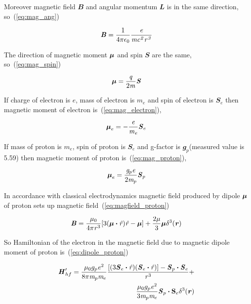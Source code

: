 \documentclass[fleqn,usenatbib]{mnras}
\begin{document}
Moreover magnetic field $\mathbfit{B}$ and angular momentum $\mathbfit{L}$ is in the same direction, so~(\ref{eq:mag_ang})

\begin{equation}
 \textbf{\textit{B}}=\frac{1}{4\pi\-\epsilon_{0}}\frac{\mathit{e}}{\mathit{mc^{2}r^{3}}}
 \label{eq:mag_ang}
\end{equation}

The direction of magnetic moment $\bmath{\mathit{\umu}}$ and spin $\mathbfit{S}$ are the same, so~(\ref{eq:mag_spin})

\begin{equation}
 \bmath{\mathit{\umu}}=\frac{\mathit{q}}{2\mathit{m}}\mathbfit{S}
 \label{eq:mag_spin}
\end{equation}

If charge of electron is $\mathit{e}$, mass of electron is $\mathit{m_{e}}$ and spin of electron is $\mathbfit{S}_{e}$ then magnetic moment of electron is~(\ref{eq:mag_electron}),

\begin{equation}
 \mathit{\bmath{\umu}}_{e}=-\frac{\mathit{e}}{\mathit{m_{e}}}\mathbfit{S}_{e}
 \label{eq:mag_electron}
\end{equation}

If mass of proton is $\mathit{m_{e}}$, spin of proton is ${\mathbfit{S}}_{e}$ and g-factor is $\mathbfit{g}_{p}$(measured value is 5.59) then magnetic moment of proton is~(\ref{eq:mag_proton}),

\begin{equation}
 \mathit{\bmath{\umu}}_{e}=\frac{\mathit{g}_{p}\mathit{e}}{2\mathit{m}_{p}}\mathbfit{S}_{p}
 \label{eq:mag_proton}
\end{equation}

In accordance with classical electrodynamics magnetic field produced by dipole $\mathit{\bmath{\umu}}$ of proton sets up magnetic field~(\ref{eq:magfield_proton})

\begin{equation}
 \mathbfit{B}=\frac{\mathit{\umu}_{0}}{4\mathit{\upi}\-\mathit{r}^{3}}[3(\mathit{\bmath{\umu}}\bmath{\cdot}\mathit{\hat{r}})\mathit{\hat{r}}-\mathit{\bmath{\umu}}]+\frac{2\mathit{\umu}}{3}\mathit{\bmath{\umu}}\mathit{\delta}^{3}(\mathbfit{r})
 \label{eq:magfield_proton}
\end{equation}

So Hamiltonian of the electron in the magnetic field due to magnetic dipole moment of proton is~(\ref{eq:dipole_proton})

\begin{equation}
\begin{split}
 \mathbfit{H}'_{hf}=\frac{\mathit{\umu}_{0}g_{p}\mathit{e}^{2}}{8\mathit{\upi}\mathit{m}_{p}\mathit{m}_{e}}\frac{[(3\mathbfit{S}_{e}\bmath{\cdot}\mathit{\hat{r}})(\mathbfit{S}_{e}\bmath{\cdot}\mathit{\hat{r}})]-\mathbfit{S}_{p}\bmath{\cdot}\mathbfit{S}_{e}}{\mathit{r}^{3}}+\\\frac{\mathit{\umu}_{0}g_{p}\mathit{e}^{2}}{3\mathit{m}_{p}\mathit{m}_{e}}\mathbfit{S}_{p}\bmath{\cdot}\mathbf{S}_{e}\delta^{3}(\mathbfit{r})
\end{split}
 \label{eq:dipole_proton}  
\end{equation}
\end{document}
